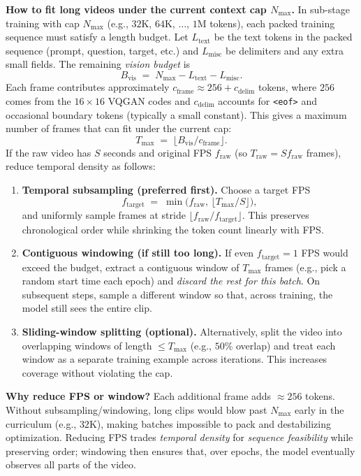 \begin{enrichment}
\begin{enrichment}
\begin{enumerate}
            \medskip
            \noindent\textbf{How to fit long videos under the current context cap \(N_{\max}\).} In sub-stage training with cap \(N_{\max}\) (e.g., \(32\mathrm{K}\), \(64\mathrm{K}\), \(\ldots\), \(1\mathrm{M}\) tokens), each packed training sequence must satisfy a length budget. Let \(L_{\text{text}}\) be the text tokens in the packed sequence (prompt, question, target, etc.) and \(L_{\text{misc}}\) be delimiters and any extra small fields. The remaining \emph{vision budget} is
            \[
            B_{\text{vis}} \;=\; N_{\max} - L_{\text{text}} - L_{\text{misc}}.
            \]
            Each frame contributes approximately \(c_{\text{frame}}\approx 256 + c_{\text{delim}}\) tokens, where \(256\) comes from the \(16{\times}16\) VQGAN codes and \(c_{\text{delim}}\) accounts for \texttt{<eof>} and occasional boundary tokens (typically a small constant). This gives a maximum number of frames that can fit under the current cap:
            \[
            T_{\max} \;=\; \big\lfloor B_{\text{vis}} / c_{\text{frame}} \big\rfloor.
            \]
            If the raw video has \(S\) seconds and original FPS \(f_{\text{raw}}\) (so \(T_{\text{raw}} \!=\! S f_{\text{raw}}\) frames), reduce temporal density as follows:
            \begin{enumerate}
                \item \textbf{Temporal subsampling (preferred first).} Choose a target FPS
                \[
                f_{\text{target}} \;=\; \min\!\Big(f_{\text{raw}},\, \big\lfloor T_{\max}/S \big\rfloor\Big),
                \]
                and uniformly sample frames at stride \(\lfloor f_{\text{raw}}/f_{\text{target}}\rfloor\). This preserves chronological order while shrinking the token count linearly with FPS.
                \item \textbf{Contiguous windowing (if still too long).} If even \(f_{\text{target}}{=}1\) FPS would exceed the budget, extract a contiguous window of \(T_{\max}\) frames (e.g., pick a random start time each epoch) and \emph{discard the rest for this batch}. On subsequent steps, sample a different window so that, across training, the model still sees the entire clip.
                \item \textbf{Sliding-window splitting (optional).} Alternatively, split the video into overlapping windows of length \(\le T_{\max}\) (e.g., \(50\%\) overlap) and treat each window as a separate training example across iterations. This increases coverage without violating the cap.
            \end{enumerate}
            \noindent\textbf{Why reduce FPS or window?} Each additional frame adds \(\approx 256\) tokens. Without subsampling/windowing, long clips would blow past \(N_{\max}\) early in the curriculum (e.g., \(32\mathrm{K}\)), making batches impossible to pack and destabilizing optimization. Reducing FPS trades \emph{temporal density} for \emph{sequence feasibility} while preserving order; windowing then ensures that, over epochs, the model eventually observes all parts of the video.
            

\end{enumerate}
\end{enrichment}
\end{enrichment}
